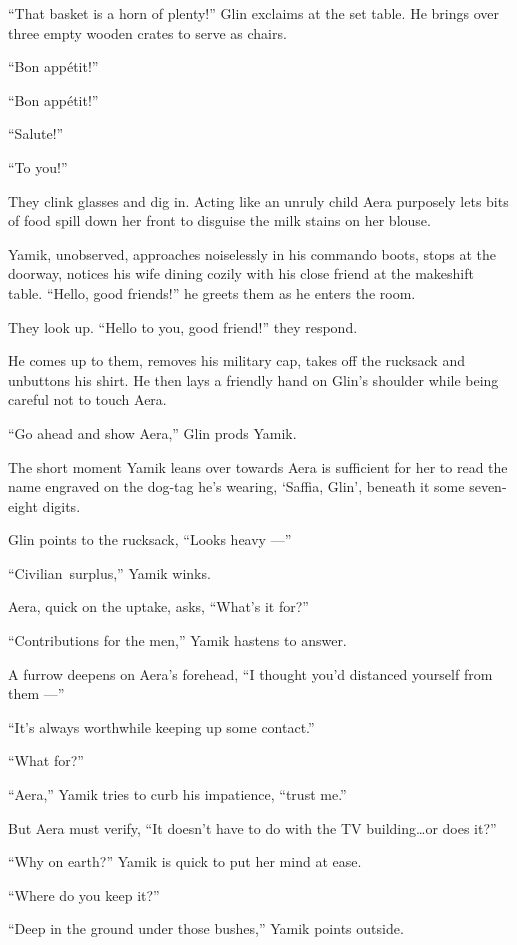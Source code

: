 \documentclass[twoside,11pt,openany]{book}
\begin{document}
``That basket is a horn of plenty!'' Glin exclaims at the set table. He brings over three
empty wooden crates to serve as chairs.

``Bon app\'etit!''

``Bon app\'etit!''

``Salute!''

``To you!''

They clink glasses and dig in. Acting like an unruly child Aera purposely lets bits of food spill down her front to
disguise the milk stains on her blouse.

Yamik, unobserved, approaches noiselessly in his commando boots, stops at the doorway, notices his wife dining cozily
with his close friend at the makeshift table. ``Hello, good friends!'' he greets them as he
enters the room.

They look up. ``Hello to you,{ }good{ }friend!'' they respond.

He comes up to them, removes{ }his military cap, takes off the rucksack and
unbuttons his shirt. He then lays a friendly hand on Glin's shoulder while being careful not to touch Aera.

``Go ahead and show Aera,'' Glin prods Yamik.

The short moment Yamik leans over towards Aera is sufficient for her to read the name engraved on the
dog-tag he's wearing, `Saffia, Glin', beneath it some seven-eight digits.

Glin points to the rucksack, ``Looks heavy ---''

``Civilian~surplus,'' Yamik winks.

Aera, quick on the uptake, asks, ``What's it for?''

``Contributions for the men,'' Yamik hastens to answer.

A furrow deepens on Aera's forehead, ``I thought you'd distanced yourself from them ---''

``It's always worthwhile keeping up some contact.''

``What for?''

``Aera,'' Yamik tries to curb his impatience, ``trust me.''

But Aera must verify, ``It doesn't have to do with
the TV building{\ldots}or does it?''

``Why on earth?'' Yamik is quick to put her mind at ease.

``Where do you keep it?''

``Deep in  the ground under those bushes,'' Yamik points outside.
\end{document}
